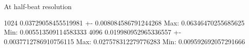 At half-beat resolution

1024     0.03729058455519981 +- 0.008084586791244268
        Max:  0.06346470255685625       Min:  0.005513509114583333
4096     0.019980952965336557 +- 0.0037712786910756115
        Max:  0.027578312279776283      Min:  0.009592692057291666